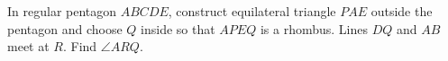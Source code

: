 In regular pentagon $ABCDE$, construct equilateral triangle $PAE$ outside the pentagon and choose $Q$ inside so that $APEQ$ is a rhombus. Lines $DQ$ and $AB$ meet at $R$. Find $\angle ARQ$.
